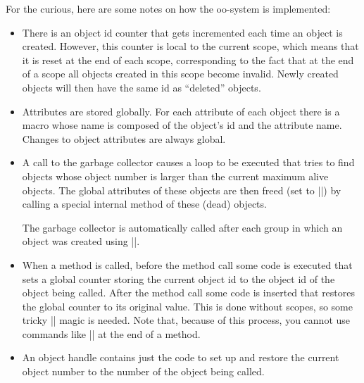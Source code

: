 For the curious, here are some notes on how the oo-system is implemented:
%
\begin{itemize}
    \item There is an object id counter that gets incremented each time an
        object is created. However, this counter is local to the current scope,
        which means that it is reset at the end of each scope, corresponding to
        the fact that at the end of a scope all objects created in this scope
        become invalid. Newly created objects will then have the same id as
        ``deleted'' objects.
    \item Attributes are stored globally. For each attribute of each object
        there is a macro whose name is composed of the object's id and the
        attribute name. Changes to object attributes are always global.
    \item A call to the garbage collector causes a loop to be executed that
        tries to find objects whose object number is larger than the current
        maximum alive objects. The global attributes of these objects are then
        freed (set to |\relax|) by calling a special internal method of these
        (dead) objects.

        The garbage collector is automatically called after each group in
        which an object was created using |\aftergroup|.
    \item When a method is called, before the method call some code is executed
        that sets a global counter storing the current object id to the object
        id of the object being called. After the method call some code is
        inserted that restores the global counter to its original value. This
        is done without scopes, so some tricky |\expandafter| magic is needed.
        Note that, because of this process, you cannot use commands like
        |\pgfutil@ifnextchar| at the end of a method.
    \item An object handle contains just the code to set up and restore the
        current object number to the number of the object being called.
\end{itemize}
